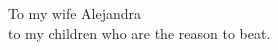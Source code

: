 
\thispagestyle{empty}
\vspace*{17mm}

\begin{flushright}
\begin{itshape}

To my wife Alejandra\\
to my children
who are the reason to beat.

\end{itshape}
\end{flushright}


